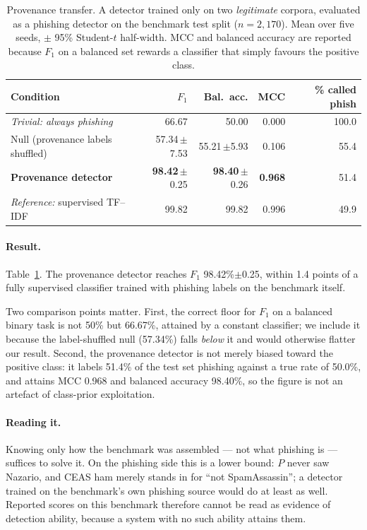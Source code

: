 \documentclass[twoside,11pt]{article}
\newcommand{\gd}[1]{\textbf{#1}}
\begin{document}
\begin{table}[t]
\centering\small
\caption{Provenance transfer. A detector trained only on two \emph{legitimate}
corpora, evaluated as a phishing detector on the benchmark test split
($n=2{,}170$). Mean over five seeds, $\pm$ 95\% Student-$t$ half-width. MCC and
balanced accuracy are reported because $F_1$ on a balanced set rewards a
classifier that simply favours the positive class.}
\label{tab:transfer}
\begin{tabular}{lrrrr}
\toprule
Condition & $F_1$ & Bal.\ acc. & MCC & \% called phish \\
\midrule
\emph{Trivial: always phishing} & 66.67 & 50.00 & 0.000 & 100.0 \\
Null (provenance labels shuffled) & 57.34\,$\pm$7.53 & 55.21\,$\pm$5.93 & 0.106 & 55.4 \\
\gd{Provenance detector} & \gd{98.42}\,$\pm$0.25 & \gd{98.40}\,$\pm$0.26 & \gd{0.968} & 51.4 \\
\midrule
\emph{Reference:} supervised TF--IDF & 99.82 & 99.82 & 0.996 & 49.9 \\
\bottomrule
\end{tabular}
\end{table}

\paragraph{Result.}
Table~\ref{tab:transfer}. The provenance detector reaches $F_1$
98.42\%$\pm$0.25, within 1.4 points of a fully supervised classifier trained
with phishing labels on the benchmark itself.

Two comparison points matter. First, the correct floor for $F_1$ on a balanced
binary task is not 50\% but 66.67\%, attained by a constant classifier; we
include it because the label-shuffled null (57.34\%) falls \emph{below} it and
would otherwise flatter our result. Second, the provenance detector is not
merely biased toward the positive class: it labels 51.4\% of the test set
phishing against a true rate of 50.0\%, and attains MCC 0.968 and balanced
accuracy 98.40\%, so the figure is not an artefact of class-prior exploitation.

\paragraph{Reading it.}
Knowing only how the benchmark was assembled --- not what phishing is ---
suffices to solve it. On the phishing side this is a lower bound: $P$ never saw
Nazario, and CEAS ham merely stands in for ``not SpamAssassin''; a detector
trained on the benchmark's own phishing source would do at least as well.
Reported scores on this benchmark therefore cannot be read as evidence of
detection ability, because a system with no such ability attains them.
\end{document}

